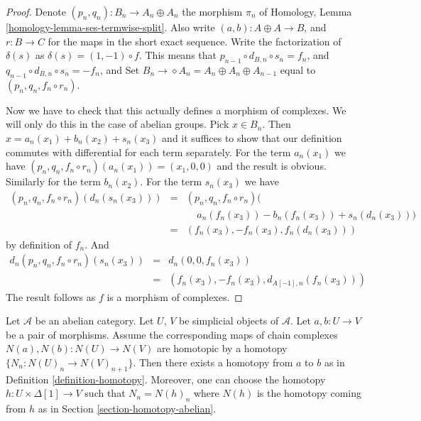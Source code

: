 \begin{proof}
Denote $(p_n, q_n) : B_n \to A_n \oplus A_n$ the morphism $\pi_n$
of Homology, Lemma \ref{homology-lemma-ses-termwise-split}.
Also write $(a, b) : A \oplus A \to B$, and
$r : B \to C$ for the maps in the short exact sequence.
Write the factorization of $\delta(s)$ as
$\delta(s) = (1, -1) \circ f$. This means that
$p_{n - 1} \circ d_{B, n} \circ s_n = f_n$, and
$q_{n - 1} \circ d_{B, n} \circ s_n = - f_n$, and
Set $B_n \to \diamond A_n = A_n \oplus A_n \oplus A_{n - 1}$
equal to $(p_n, q_n, f_n \circ r_n)$.

\medskip\noindent
Now we have to check that this actually defines a morphism
of complexes. We will only do this in the case of abelian groups.
Pick $x \in B_n$. Then $x = a_n(x_1) + b_n(x_2) + s_n(x_3)$
and it suffices to show that our definition commutes
with differential for each term separately. For the term
$a_n(x_1)$ we have $(p_n, q_n, f_n \circ r_n)(a_n(x_1)) =
(x_1, 0, 0)$ and the result is obvious. Similarly for
the term $b_n(x_2)$. For the term $s_n(x_3)$ we have
\begin{eqnarray*}
(p_n, q_n, f_n \circ r_n)(d_n(s_n(x_3))) & = &
(p_n, q_n, f_n \circ r_n)( \\
& & \ \ \ \ \ a_n(f_n(x_3)) - b_n(f_n(x_3)) + s_n(d_n(x_3))) \\
& = &
(f_n(x_3), -f_n(x_3), f_n(d_n(x_3)))
\end{eqnarray*}
by definition of $f_n$. And
\begin{eqnarray*}
d_n(p_n, q_n, f_n \circ r_n)(s_n(x_3)) & = & d_n(0, 0, f_n(x_3)) \\
& = &
(f_n(x_3), - f_n(x_3), d_{A[-1], n}(f_n(x_3)))
\end{eqnarray*}
The result follows as $f$ is a morphism of complexes.
\end{proof}

\begin{lemma}
\label{lemma-backwards-homotopy}
Let $\mathcal{A}$ be an abelian category.
Let $U$, $V$ be simplicial objects of $\mathcal{A}$.
Let $a, b : U \to V$ be a pair of morphisms.
Assume the corresponding maps of chain complexes
$N(a), N(b) : N(U) \to N(V)$ are homotopic by
a homotopy $\{N_n : N(U)_n \to N(V)_{n + 1}\}$.
Then there exists a homotopy from $a$ to $b$ as in
Definition \ref{definition-homotopy}. Moreover, one can choose the
homotopy $h : U \times \Delta[1] \to V$ such that
$N_n = N(h)_n$ where $N(h)$ is the homotopy coming
from $h$ as in Section \ref{section-homotopy-abelian}.
\end{lemma}

